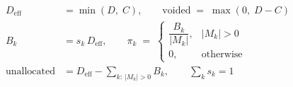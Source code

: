 \documentclass[border=10pt,preview]{standalone}
\begin{document}
\[
\begin{aligned}
D_{\text{eff}} &= \min\!\left(D,\;C\right), \qquad
\text{voided} \;=\; \max\!\left(0,\;D-C\right)\\[6pt]
B_k &= s_k\,D_{\text{eff}},
\qquad
\pi_k \;=\;
\begin{cases}
\dfrac{B_k}{\lvert M_k\rvert}, & \lvert M_k\rvert>0\\[10pt]
0, & \text{otherwise}
\end{cases}\\[6pt]
\text{unallocated} &= D_{\text{eff}}-\!\!\sum_{k:\,\lvert M_k\rvert>0}\!\! B_k,
\qquad \textstyle\sum_k s_k = 1
\end{aligned}
\]
\end{document}
